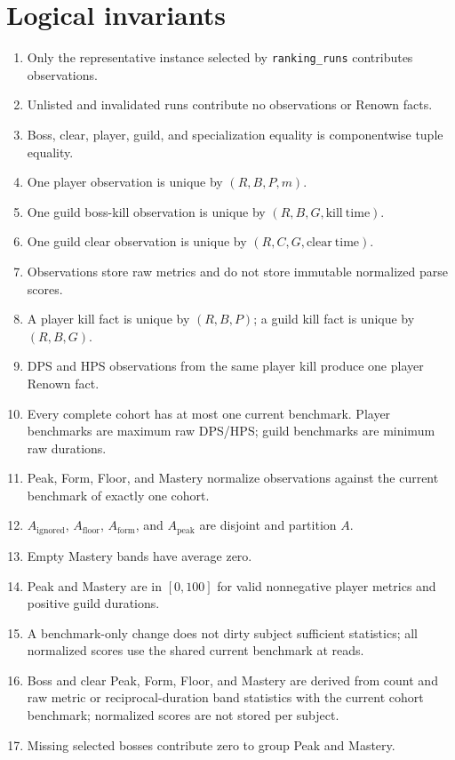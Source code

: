 \documentclass[11pt]{article}
\newcommand{\field}[1]{\texttt{#1}}
\begin{document}
\section{Logical invariants}
\begin{enumerate}
  \item Only the representative instance selected by \field{ranking\_\allowbreak runs} contributes observations.
  \item Unlisted and invalidated runs contribute no observations or Renown facts.
  \item Boss, clear, player, guild, and specialization equality is componentwise tuple equality.
  \item One player observation is unique by $(R,B,P,m)$.
  \item One guild boss-kill observation is unique by $(R,B,G,\mathrm{kill\ time})$.
  \item One guild clear observation is unique by $(R,C,G,\mathrm{clear\ time})$.
  \item Observations store raw metrics and do not store immutable normalized parse scores.
  \item A player kill fact is unique by $(R,B,P)$; a guild kill fact is unique by $(R,B,G)$.
  \item DPS and HPS observations from the same player kill produce one player Renown fact.
  \item Every complete cohort has at most one current benchmark. Player benchmarks are maximum raw DPS/HPS; guild benchmarks are minimum raw durations.
  \item Peak, Form, Floor, and Mastery normalize observations against the current benchmark of exactly one cohort.
  \item $A_{\mathrm{ignored}}$, $A_{\mathrm{floor}}$, $A_{\mathrm{form}}$, and $A_{\mathrm{peak}}$ are disjoint and partition $A$.
  \item Empty Mastery bands have average zero.
  \item Peak and Mastery are in $[0,100]$ for valid nonnegative player metrics and positive guild durations.
  \item A benchmark-only change does not dirty subject sufficient statistics; all normalized scores use the shared current benchmark at reads.
  \item Boss and clear Peak, Form, Floor, and Mastery are derived from count and raw metric or reciprocal-duration band statistics with the current cohort benchmark; normalized scores are not stored per subject.
  \item Missing selected bosses contribute zero to group Peak and Mastery.

\end{enumerate}
\end{document}
